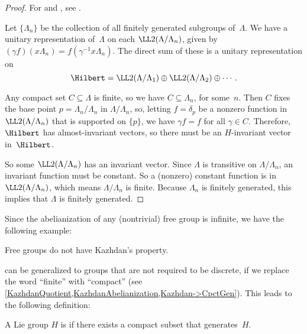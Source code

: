  
\begin{proof}
 For  and , see .
 
  Let $\{ \Lambda_n \}$ be the collection of all finitely
generated subgroups of~$\Lambda$.
  We have a unitary representation of~$\Lambda$ on each $\LL2(\Lambda/\Lambda_n)$, 
given by $(\gamma f)(x \Lambda_n) = f(\gamma^{-1} x \Lambda_n)$.
The direct sum of these is a unitary representation on
 $$\Hilbert = \LL2(\Lambda/\Lambda_1) \oplus \LL2(\Lambda/\Lambda_2) \oplus
\cdots. $$

Any compact set $C \subseteq \Lambda$ is finite, so we have
$C \subseteq \Lambda_n$, for some~$n$.
 Then $C$ fixes the base point $p = \Lambda_n/\Lambda_n$ in $\Lambda
/\Lambda_n$,
 so, letting $f = \delta_p$ be a nonzero function in
$\LL2(\Lambda/\Lambda_n)$ that is supported on $\{p\}$,
 we have $\gamma f = f$ for all $\gamma \in C$. Therefore,
$\Hilbert$ has almost-invariant vectors, so there must be
an $H$-invariant vector in~$\Hilbert$.

 So some $\LL2(\Lambda/\Lambda_n)$  has an invariant vector.
 Since $\Lambda$ is transitive on $\Lambda/\Lambda_n$, 
  an invariant function must be constant.
 So a (nonzero) constant function is in $\LL2(\Lambda/\Lambda_n)$,
 which means $\Lambda /\Lambda_n$ is finite.
 Because $\Lambda_n$ is finitely generated, this implies that 
$\Lambda $ is finitely generated.
 \end{proof}

Since the abelianization of any (nontrivial) free group is infinite, we have the following example:

\begin{cor} \label{FreeNotT}
 Free groups do not have Kazhdan's property.
 \end{cor}
 
\begin{rem}
 can be generalized to groups that are not required to be discrete, if we replace the word ``finite'' with ``compact'' (see \cref{KazhdanQuotient,KazhdanAbelianization,Kazhdan->CpctGen}). This leads to the following definition:
\end{rem}

\begin{defn} \label{CpctGenDefn}
A Lie group $H$ is  if there exists a compact subset that generates~$H$. 
\end{defn}

